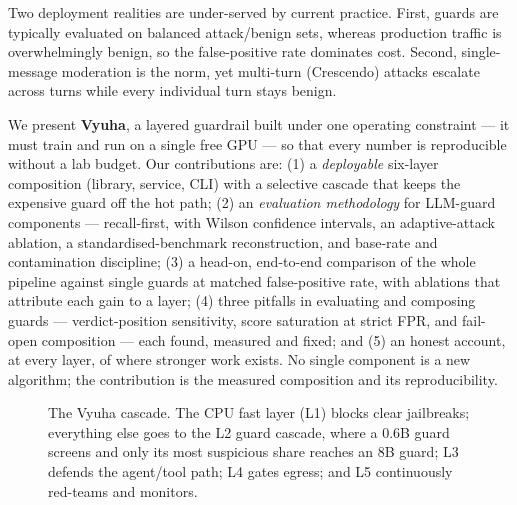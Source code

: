 \documentclass[11pt]{article}
\begin{document}
Two deployment realities are under-served by current practice. First, guards are typically evaluated
on balanced attack/benign sets, whereas production traffic is overwhelmingly benign, so the
false-positive rate dominates cost. Second, single-message moderation is the norm, yet multi-turn
(Crescendo) attacks \citep{crescendo} escalate across turns while every individual turn stays benign.

We present \textbf{Vyuha}, a layered guardrail built under one operating constraint --- it must train
and run on a single free GPU --- so that every number is reproducible without a lab budget. Our
contributions are: (1) a \emph{deployable} six-layer composition (library, service, CLI) with a
selective cascade that keeps the expensive guard off the hot path; (2) an \emph{evaluation
methodology} for LLM-guard components --- recall-first, with Wilson confidence intervals, an
adaptive-attack ablation, a standardised-benchmark reconstruction, and base-rate and contamination
discipline; (3) a head-on, end-to-end comparison of the whole pipeline against single guards at matched
false-positive rate, with ablations that attribute each gain to a layer; (4) three pitfalls in evaluating and composing guards --- verdict-position sensitivity,
score saturation at strict FPR, and fail-open composition --- each found, measured and fixed; and (5) an
honest account, at every layer, of where stronger work exists. No single
component is a new algorithm; the contribution is the measured composition and its reproducibility.

\begin{figure}[t]
\centering
{}
\caption{The Vyuha cascade. The CPU fast layer (L1) blocks clear jailbreaks; everything else goes to
the L2 guard cascade, where a 0.6B guard screens and only its most suspicious share reaches an 8B guard;
L3 defends the agent/tool path; L4 gates
egress; and L5 continuously red-teams and monitors.}
\label{fig:arch}
\end{figure}
\end{document}
